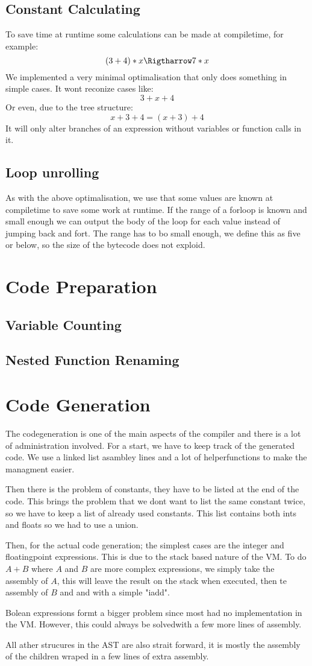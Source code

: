 \documentclass[a4paper,11pt]{report}
\begin{document}
\subsection{Constant Calculating}
To save time at runtime some calculations can be made at compiletime, for example:
\[
(3+4)*x \Rigtharrow 7*x
\]
We implemented a very minimal optimalisation that only does something in simple cases.
It wont reconize cases like:
\[
3+x+4
\]
Or even, due to the tree structure:
\[
x+3+4 = (x+3)+4
\]
It will only alter branches of an expression without variables or function calls in it.
\subsection{Loop unrolling}
As with the above optimalisation, we use that some values are known at compiletime to save some work at runtime.
If the range of a forloop is known and small enough we can output the body of the loop for each value instead of jumping back and fort.
The range has to bo small enough, we define this as five or below, so the size of the bytecode does not exploid.


\section{Code Preparation}
\subsection{Variable Counting}
\subsection{Nested Function Renaming}

\section{Code Generation}
The codegeneration is one of the main aspects of the compiler and there is a lot of administration involved.
For a start, we have to keep track of the generated code.
We use a linked list asambley lines and a lot of helperfunctions to make the managment easier.

Then there is the problem of constants, they have to be listed at the end of the code.
This brings the problem that we dont want to list the same constant twice, so we have to keep a list of already used constants.
This list contains both ints and floats so we had to use a union.
 
Then, for the actual code generation; the simplest cases are the integer and floatingpoint expressions.
This is due to the stack based nature of the VM. To do $A+B$ where $A$ and $B$ are more complex expressions, we simply take the assembly of $A$, this will leave the result on the stack when executed, then te assembly of $B$ and and with a simple "iadd".

Bolean expressions formt a bigger problem since most had no implementation in the VM. However, this could always be solvedwith a few more lines of assembly.

All ather strucures in the AST are also strait forward, it is mostly the assembly of the children wraped in a few lines of extra assembly.
\end{document}
